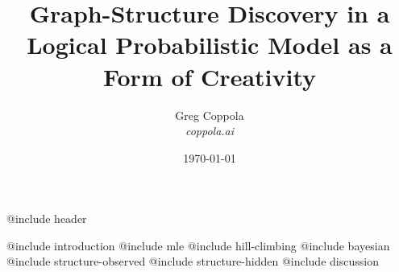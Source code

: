 \documentclass[12pt]{article}
\title{\bf Graph-Structure Discovery in a Logical Probabilistic Model as a Form of Creativity}
\author{
    Greg Coppola \\
    {\em coppola.ai}
}
\date{\today}
\begin{document}
\maketitle

@include header


\tableofcontents

\cite{coppola2024}
@include introduction
@include mle
@include hill-climbing
@include bayesian
@include structure-observed
@include structure-hidden
@include discussion




\end{document}
